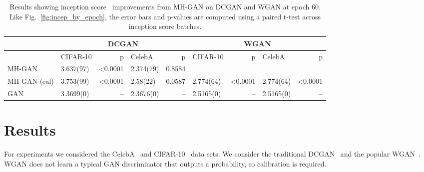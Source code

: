 \documentclass{article}
\begin{document}
\begin{table}[htbp]
\centering
    \caption{{\small
    Results showing inception score~\citep{Salimans2016} improvements from MH-GAN on DCGAN and WGAN at epoch 60.
    Like Fig.~\ref{fig:incep_by_epoch}, the error bars and p-values are computed using a paired t-test across inception score batches.
    }}
    \label{tbl:inception}
{\scriptsize
\begin{tabular}{|l|l|r|l|r||l|r|l|r|}
\toprule
~                 & \multicolumn{4}{c}{DCGAN}                               & \multicolumn{4}{c}{WGAN} \\
\toprule
~                 & CIFAR-10         &      p   & CelebA         &      p   & CIFAR-10        &       p   & CelebA        &       p  \\
\midrule
MH-GAN            &        3.637(97) &  <0.0001 &      2.374(79) &  0.8584  &              ~  &        ~  &            ~  &      ~   \\
MH-GAN (cal)      &        3.753(99) &  <0.0001 &      2.58(22)  &  0.0587  &       2.774(64) &   <0.0001 &     2.774(64) &  <0.0001 \\
GAN               &        3.3699(0) &       -- &      2.3676(0) &      --  &       2.5165(0) &        -- &     2.5165(0) &       -- \\
\bottomrule
\end{tabular}
}
\end{table}


\section{Results}
\label{sec:Results}

For experiments we considered the CelebA~\citep{Liu2015} and CIFAR-10~\citep{Torralba2008} data sets.
We consider the traditional DCGAN~\citep{Radford2015} and the popular WGAN~\citep{Arjovsky2017}\@.
WGAN does not learn a typical GAN discriminator that outputs a probability, so calibration is required.

\end{document}
